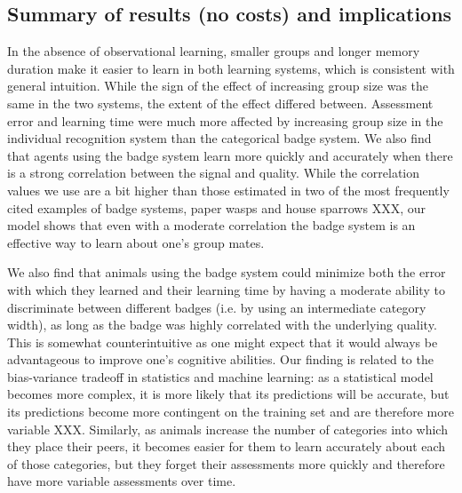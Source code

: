 \subsection*{Summary of results (no costs) and implications} %
In the absence of observational learning, smaller groups and longer memory duration make it easier to learn in both learning systems, which is consistent with general intuition. While the sign of the effect of increasing group size was the same in the two systems, the extent of the effect differed between. Assessment error and learning time were much more affected by increasing group size in the individual recognition system than the categorical badge system. We also find that agents using the badge system learn more quickly and accurately when there is a strong correlation between the signal and quality. While the correlation values we use are a bit higher than those estimated in two of the most frequently cited examples of badge systems, paper wasps and house sparrows XXX, our model shows that even with a moderate correlation the badge system is an effective way to learn about one's group mates.  


We also find that animals using the badge system could minimize both the error with which they learned and their learning time by having a moderate ability to discriminate between different badges (i.e. by using an intermediate category width), as long as the badge was highly correlated with the underlying quality. This is somewhat counterintuitive as one might expect that it would always be advantageous to improve one's cognitive abilities. Our finding is related to the bias-variance tradeoff in statistics and machine learning: as a statistical model becomes more complex, it is more likely that its predictions will be accurate, but its predictions become more contingent on the training set and are therefore more variable XXX. Similarly, as animals increase the number of categories into which they place their peers, it becomes easier for them to learn accurately about each of those categories, but they forget their assessments more quickly and therefore have more variable assessments over time. 

